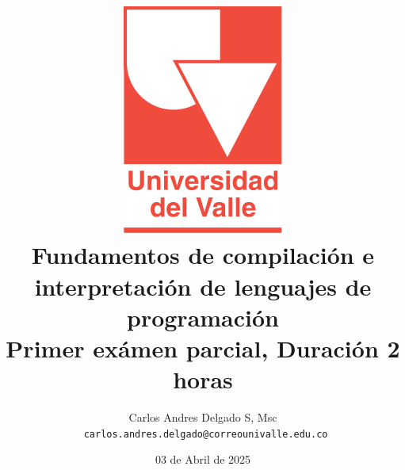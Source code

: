 \title{\includegraphics[scale=0.2]{../imagenes/univalle.png} \\ Fundamentos de compilación e interpretación de lenguajes de programación \\ Primer exámen parcial, Duración 2 horas \vspace{-0.5cm}} 
\author{Carlos Andres Delgado S, Msc \\ \texttt{ carlos.andres.delgado@correounivalle.edu.co}}
\date{\vspace{-0.2cm}03 de Abril de 2025}

